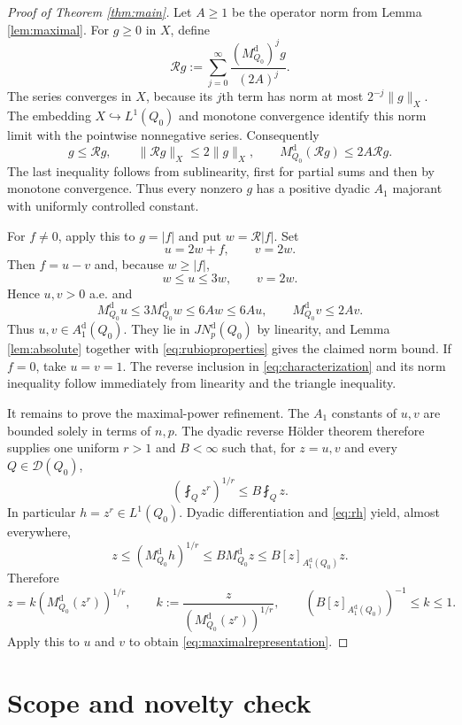 \documentclass[11pt]{article}
\newcommand{\avg}{\mathop{\fint}}
\newcommand{\D}{\mathcal D}
\newcommand{\M}{M^{\mathrm d}_{Q_0}}
\newcommand{\JN}{JN^{\mathrm d}_p(Q_0)}
\newcommand{\Aone}{A^{\mathrm d}_1(Q_0)}
\newcommand{\Rop}{\mathcal R}
\begin{document}
\begin{proof}[Proof of Theorem \ref{thm:main}]
Let $A\geq1$ be the operator norm from Lemma \ref{lem:maximal}.  For
$g\geq0$ in $X$, define
\begin{equation}\label{eq:rubio}
 \Rop g:=\sum_{j=0}^{\infty}\frac{(\M)^j g}{(2A)^j}.
\end{equation}
The series converges in $X$, because its $j$th term has norm at most
$2^{-j}\|g\|_X$.  The embedding $X\hookrightarrow L^1(Q_0)$ and monotone
convergence identify this norm limit with the pointwise nonnegative series.
Consequently
\begin{equation}\label{eq:rubioproperties}
 g\leq\Rop g,
 \qquad \|\Rop g\|_X\leq2\|g\|_X,
 \qquad \M(\Rop g)\leq2A\Rop g.
\end{equation}
The last inequality follows from sublinearity, first for partial sums and then
by monotone convergence.  Thus every nonzero $g$ has a positive dyadic $A_1$
majorant with uniformly controlled constant.

For $f\neq0$, apply this to $g=|f|$ and put $w=\Rop|f|$.  Set
\[
 u=2w+f,
 \qquad v=2w.
\]
Then $f=u-v$ and, because $w\geq|f|$,
\[
 w\leq u\leq3w,
 \qquad v=2w.
\]
Hence $u,v>0$ a.e. and
\[
 \M u\leq3\M w\leq6Aw\leq6Au,
 \qquad \M v\leq2A v.
\]
Thus $u,v\in\Aone$.  They lie in $\JN$ by linearity, and Lemma
\ref{lem:absolute} together with \eqref{eq:rubioproperties} gives the claimed
norm bound.  If $f=0$, take $u=v=1$.  The reverse inclusion in
\eqref{eq:characterization} and its norm inequality follow immediately from
linearity and the triangle inequality.

It remains to prove the maximal-power refinement.  The $A_1$ constants of
$u,v$ are bounded solely in terms of $n,p$.  The dyadic reverse H\"older
theorem therefore supplies one uniform $r>1$ and $B<\infty$ such that, for
$z=u,v$ and every $Q\in\D(Q_0)$,
\begin{equation}\label{eq:rh}
 \left(\avg_Qz^r\right)^{1/r}\leq B\avg_Qz.
\end{equation}
In particular $h=z^r\in L^1(Q_0)$.  Dyadic differentiation and
\eqref{eq:rh} yield, almost everywhere,
\[
 z\leq(\M h)^{1/r}
 \leq B\M z
 \leq B[z]_{\Aone}z.
\]
Therefore
\[
 z=k(\M(z^r))^{1/r},
 \qquad k:=\frac{z}{(\M(z^r))^{1/r}},
 \qquad (B[z]_{\Aone})^{-1}\leq k\leq1.
\]
Apply this to $u$ and $v$ to obtain \eqref{eq:maximalrepresentation}.
\end{proof}

\section{Scope and novelty check}
\end{document}
